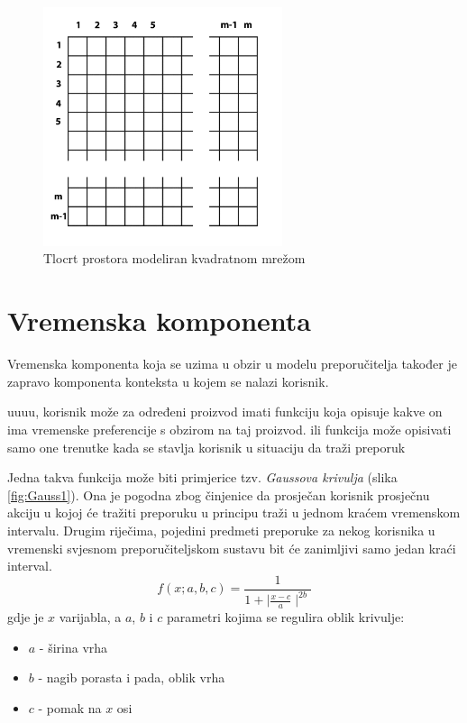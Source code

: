 \documentclass[times, utf8, diplomski, numeric]{fer}
\begin{document}
\begin{figure}[htb]
	\centering
	\includegraphics[width=7cm]{images/grid.png}
	\caption{Tlocrt prostora modeliran kvadratnom mrežom}
	\label{fig:StoreGrid}
\end{figure}

\section{Vremenska komponenta}

Vremenska komponenta koja se uzima u obzir u modelu preporučitelja također je
zapravo komponenta konteksta u kojem se nalazi korisnik. 

uuuu, korisnik može za određeni proizvod imati funkciju koja opisuje kakve on
ima vremenske preferencije s obzirom na taj proizvod. ili funkcija može
opisivati samo one trenutke kada se stavlja korisnik u situaciju da traži
preporuk

Jedna takva funkcija može biti primjerice tzv. \emph{Gaussova krivulja}
(slika \ref{fig:Gauss1}). Ona je pogodna zbog činjenice da prosječan korisnik
prosječnu akciju u kojoj će tražiti preporuku u principu traži u jednom kraćem
vremenskom intervalu. Drugim riječima, pojedini predmeti preporuke za nekog
korisnika u vremenski svjesnom preporučiteljskom sustavu bit će zanimljivi samo
jedan kraći interval.
\begin{equation}
	\label{eq:BellFunc}
	f(x;a,b,c) = \frac
	{
		1
	}
	{
		1 + \mid\frac{x - c}{a}\mid^{2b}
	}
\end{equation}
gdje je $x$ varijabla, a $a$, $b$ i $c$ parametri kojima se regulira oblik
krivulje:
\begin{itemize}
  \item $a$ - širina vrha
  \item $b$ - nagib porasta i pada, oblik vrha
  \item $c$ - pomak na $x$ osi
\end{itemize}
\end{document}
